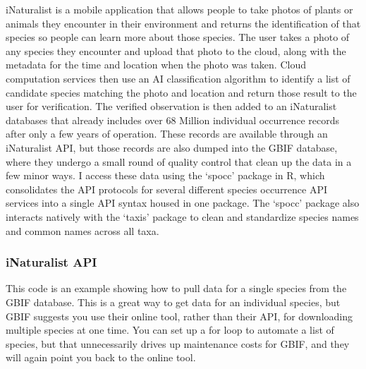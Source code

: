 \documentclass[
]{article}
\begin{document}
iNaturalist is a mobile application that allows people to take photos of
plants or animals they encounter in their environment and returns the
identification of that species so people can learn more about those
species. The user takes a photo of any species they encounter and upload
that photo to the cloud, along with the metadata for the time and
location when the photo was taken. Cloud computation services then use
an AI classification algorithm to identify a list of candidate species
matching the photo and location and return those result to the user for
verification. The verified observation is then added to an iNaturalist
databases that already includes over 68 Million individual occurrence
records after only a few years of operation. These records are available
through an iNaturalist API, but those records are also dumped into the
GBIF database, where they undergo a small round of quality control that
clean up the data in a few minor ways. I access these data using the
`spocc' package in R, which consolidates the API protocols for several
different species occurrence API services into a single API syntax
housed in one package. The `spocc' package also interacts natively with
the `taxis' package to clean and standardize species names and common
names across all taxa.

\hypertarget{inaturalist-api}{%
\subsubsection{iNaturalist API}\label{inaturalist-api}}

This code is an example showing how to pull data for a single species
from the GBIF database. This is a great way to get data for an
individual species, but GBIF suggests you use their online tool, rather
than their API, for downloading multiple species at one time. You can
set up a for loop to automate a list of species, but that unnecessarily
drives up maintenance costs for GBIF, and they will again point you back
to the online tool.
\end{document}
